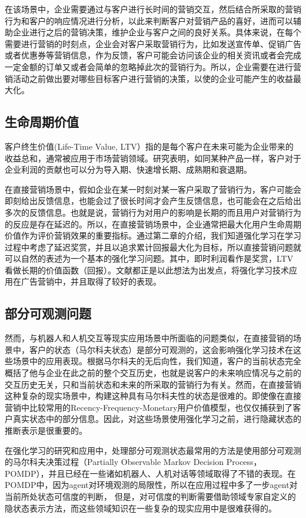 在该场景中，企业需要通过与客户进行长时间的营销交互，然后结合所采取的营销行为和客户的响应情况进行分析，以此来判断客户对营销产品的喜好，进而可以辅助企业进行之后的营销决策，维护企业与客户之间的良好关系。具体来说，在每个需要进行营销的时刻点，企业会对客户采取营销行为，比如发送宣传单、促销广告或者优惠券等营销信息，作为反馈，客户可能会访问该企业的相关资讯或者会完成一定金额的订单又或者会简单的忽略掉此次的营销行为。所以，企业需要在进行营销活动之前做出要对哪些目标客户进行营销的决策，以使的企业可能产生的收益最大化。

\subsection{生命周期价值}
客户终生价值(Life-Time Value, LTV）指的是每个客户在未来可能为企业带来的收益总和，通常被应用于市场营销领域。研究表明，如同某种产品一样，客户对于企业利润的贡献也可以分为导入期、快速增长期、成熟期和衰退期。

在直接营销场景中，假如企业在某一时刻对某一客户采取了营销行为，客户可能会即刻给出反馈信息，也能会过了很长时间才会产生反馈信息，也可能会在之后给出多次的反馈信息。也就是说，营销行为对用户的影响是长期的而且用户对营销行为的反应是存在延迟的。所以，在直接营销场景中，企业通常把最大化用户生命周期价值作为评价营销效果的重要指标。通过第二章的介绍，我们知道强化学习在学习过程中考虑了延迟奖赏，并且以追求累计回报最大化为目标，所以直接营销问题就可以自然的表述为一个基本的强化学习问题。其中，即时利润看作是奖赏，LTV看做长期的价值函数（回报）。文献\citep{tkachenko2015autonomous,pednault2002sequential,silver2013concurrent}都正是以此想法为出发点，将强化学习技术应用在广告营销中，并且取得了较好的表现。

\subsection{部分可观测问题}
然而，与机器人和人机交互等现实应用场景中所面临的问题类似，在直接营销的场景中，客户的状态（马尔科夫状态）是部分可观测的，这会影响强化学习技术在这些场景中的应用表现。根据马尔科夫的无后向性，我们知道，客户的当前状态完全概括了他与企业在此之前的整个交互历史，也就是说客户的未来响应情况与之前的交互历史无关，只和当前状态和未来的所采取的营销行为有关。然而，在直接营销这种复杂的现实场景中，构建这种具有马尔科夫性的状态是很难的。即使像在直接营销中比较常用的Recency-Frequency-Monetary用户价值模型\citep{tkachenko2015autonomous}，也仅仅捕获到了客户真实状态中的部分信息。因此，对这些场景使用强化学习之前，进行隐藏状态的推断表示是很重要的。

在强化学习的研究和应用中，处理部分可观测状态最常用的方法是使用部分可观测的马尔科夫决策过程（Partially Observable Markov  Decision Process，POMDP）\citep{kaelbling1998planning}，并且已经在一些诸如机器人、人机对话等领域取得了不错的表现\citep{pineau2003point,williams2007partially}。在POMDP中，因为agent对环境观测的局限性，所以在应用过程中多了一步agent对当前所处状态可信度的判断，
但是，对可信度的判断需要借助领域专家自定义的隐状态表示方法，而这些领域知识在一些复杂的现实应用中是很难获得的。


